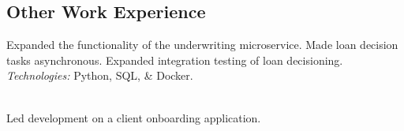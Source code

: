 \documentclass[11pt,letter,sans]{moderncv}
\newcommand{\dingbat}{\color{color1}{\large\photon}}
\begin{document}

\subsection{\textbf{Other Work Experience}}
Expanded the functionality of the underwriting microservice.
Made loan decision tasks asynchronous.
Expanded integration testing of loan decisioning.
\textit{Technologies:} Python, SQL, \& Docker.\\
\centerline{\dingbat}
\\
Led development on a client onboarding application.
\end{document}

